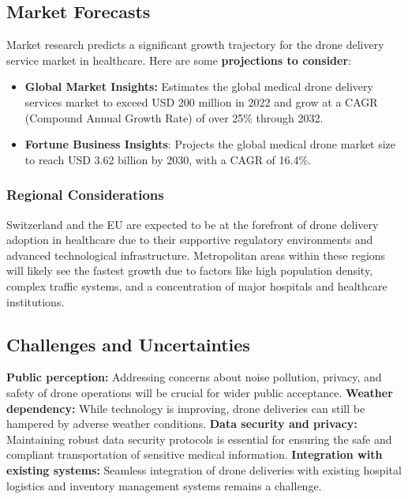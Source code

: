 \subsection{Market Forecasts}
Market research predicts a significant growth trajectory for the drone delivery service market in healthcare. Here are some \textbf{projections to consider}:
\begin{itemize}
  \item \textbf{Global Market Insights:} Estimates the global medical drone delivery services market to exceed USD 200 million in 2022 and grow at a CAGR (Compound Annual Growth Rate) of over 25\% through 2032. \cite{fortunebusinessinsights_2023_medical}
  \item \textbf{Fortune Business Insights}: Projects the global medical drone market size to reach USD 3.62 billion by 2030, with a CAGR of 16.4\%. \cite{fortunebusinessinsights_2023_medical}
\end{itemize}
\subsubsection{Regional Considerations}
Switzerland and the EU are expected to be at the forefront of drone delivery adoption in healthcare due to their supportive regulatory environments and advanced technological infrastructure. \cite{fortunebusinessinsights_2023_medical}
\newline
\newline
Metropolitan areas within these regions will likely see the fastest growth due to factors like high population density, complex traffic systems, and a concentration of major hospitals and healthcare institutions. \cite{fortunebusinessinsights_2023_medical}
\subsection{Challenges and Uncertainties}
\textbf{Public perception:} Addressing concerns about noise pollution, privacy, and safety of drone operations will be crucial for wider public acceptance. \cite{fortunebusinessinsights_2023_medical}
\newline
\textbf{Weather dependency:} While technology is improving, drone deliveries can still be hampered by adverse weather conditions. \cite{fortunebusinessinsights_2023_medical}
\newline
\textbf{Data security and privacy:} Maintaining robust data security protocols is essential for ensuring the safe and compliant transportation of sensitive medical information. \cite{fortunebusinessinsights_2023_medical}
\newline
\textbf{Integration with existing systems:} Seamless integration of drone deliveries with existing hospital logistics and inventory management systems remains a challenge. \cite{fortunebusinessinsights_2023_medical}
